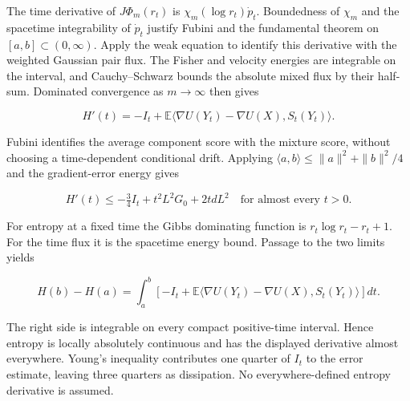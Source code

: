 \documentclass[11pt,a4paper]{report}
\begin{document}
The time derivative of \(J\Phi_m(r_t)\) is \(\chi_m(\log r_t)\dot p_t\). Boundedness of \(\chi_m\) and the spacetime integrability of \(\dot p_t\) justify Fubini and the fundamental theorem on \([a,b]\subset(0,\infty)\). Apply the weak equation to identify this derivative with the weighted Gaussian pair flux. The Fisher and velocity energies are integrable on the interval, and Cauchy–Schwarz bounds the absolute mixed flux by their half-sum. Dominated convergence as \(m\to\infty\) then gives

\[H'(t)=-I_t+\mathbb E\langle\nabla U(Y_t)-\nabla U(X),S_t(Y_t)\rangle.\]

Fubini identifies the average component score with the mixture score, without choosing a time-dependent conditional drift. Applying \(\langle a,b\rangle\le\|a\|^2+\|b\|^2/4\) and the gradient-error energy gives

\[\boxed{H'(t)\le-\tfrac34I_t+t^2L^2G_0+2tdL^2}\quad\text{for almost every }t>0.\]

For entropy at a fixed time the Gibbs dominating function is \(r_t\log r_t-r_t+1\). For the time flux it is the spacetime energy bound. Passage to the two limits yields

\[H(b)-H(a)=\int_a^b\left[-I_t+
\mathbb E\langle\nabla U(Y_t)-\nabla U(X),S_t(Y_t)\rangle\right]dt.\]

The right side is integrable on every compact positive-time interval. Hence entropy is locally absolutely continuous and has the displayed derivative almost everywhere. Young’s inequality contributes one quarter of \(I_t\) to the error estimate, leaving three quarters as dissipation. No everywhere-defined entropy derivative is assumed.
\end{document}
